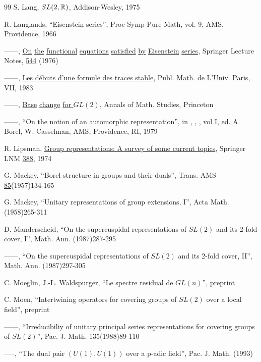 \begin{thebibliography}{99}
 S. Lang, \underline{$SL(2,{\Bbb{R}})$}, Addison-Wesley, 1975

 R. Langlands, ``Eisenstein series'', Proc Symp Pure Math, 
vol. 9, AMS,
Providence, 1966

 ------, \underline{On} \underline{the} \underline{functional}
\underline{equations} \underline{satisfied}
\underline{by} \underline{Eisenstein} 
\underline{series}, Springer Lecture Notes, \underline{544} (1976)

 ------, \underline{Les d\'ebuts d'une formule des traces 
stable}, Publ. Math. de L'Univ. Paris, VII, 1983

 ------, \underline{Base} \underline{change} 
\underline{for $GL(2)$},
Annals of Math. Studies, Princeton

 ------, ``On the notion of an automorphic
representation'', in
 ,
,  ,
vol I, ed. A. Borel, W. Casselman, AMS, Providence, RI, 1979

R. Lipsman, \underline{Group representations: A survey of some current
topics},
\newline
Springer LNM \underline{388}, 1974

 G. Mackey, ``Borel structure in groups and their duals'', 
Trans. AMS
\underline{85}(1957)134-165

 G. Mackey, ``Unitary representations of group extensions, I'',
Acta Math. (1958)265-311

 D. Manderscheid, ``On the supercuspidal representations of
$SL(2)$ and its 2-fold cover, I'', Math. Ann. (1987)287-295

 ------, ``On the supercuspidal representations of
$SL(2)$ and its 2-fold cover, II'', Math. Ann.
(1987)297-305

 C. Moeglin, J.-L. Waldspurger,
``Le spectre residual de $GL(n)$'', preprint

 C. Moen, ``Intertwining operators for covering groups 
of $SL(2)$ over
a local field'', preprint

 ------, ``Irreducibiliy of unitary principal series 
representations
for covering groups of $SL(2)$'', Pac. J. Math. 135(1988)89-110

 -----, ``The dual pair $(U(1),U(1))$ over a p-adic field'',
Pac. J. Math. (1993)


\end{thebibliography}
